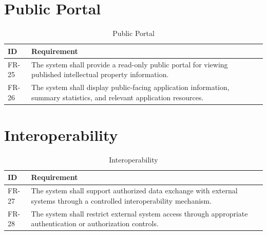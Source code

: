 \section{Public Portal}

\begin{table}[H]
\centering
\small
\caption{Public Portal}
\label{tab:fr_public_portal}
\begin{tabular}{|p{2.2cm}|p{12cm}|}
\hline
\textbf{ID} & \textbf{Requirement} \\
\hline
FR-25 & The system shall provide a read-only public portal for viewing published intellectual property information. \\
\hline
FR-26 & The system shall display public-facing application information, summary statistics, and relevant application resources. \\
\hline
\end{tabular}
\end{table}

\section{Interoperability}

\begin{table}[H]
\centering
\small
\caption{Interoperability}
\label{tab:fr_interoperability}
\begin{tabular}{|p{2.2cm}|p{12cm}|}
\hline
\textbf{ID} & \textbf{Requirement} \\
\hline
FR-27 & The system shall support authorized data exchange with external systems through a controlled interoperability mechanism. \\
\hline
FR-28 & The system shall restrict external system access through appropriate authentication or authorization controls. \\
\hline
\end{tabular}
\end{table}